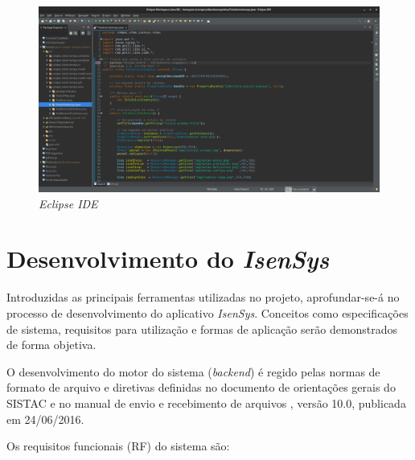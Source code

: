 \documentclass[
	12pt,			%
	openright,		%
	oneside,	
	a4paper,		%
	english,		%
	brazil			%
]{abntex2/abntex2}  %
\begin{document}
			\begin{figure}[H]
				\begin{center}
				
					\caption{\textit{Eclipse IDE}}
					\label{eclipse-img}
				
					\includegraphics[scale=0.25]{img/eclipse-ide}
					
				\end{center}
			\end{figure}

	\chapter{Desenvolvimento do \textit{IsenSys}} \label{cap3-desenvolvimento}

		Introduzidas as principais ferramentas utilizadas no projeto, aprofundar-se-á no processo de desenvolvimento do aplicativo \textit{IsenSys}. Conceitos como especificações de sistema, requisitos para utilização e formas de aplicação serão demonstrados de forma objetiva.
		
		O desenvolvimento do motor do sistema (\textit{backend}) é regido pelas normas de formato de arquivo e diretivas definidas no documento de orientações gerais do SISTAC \cite{sistac-gerais} e no manual de envio e recebimento de arquivos \cite{sistac-formatos}, versão 10.0, publicada em 24/06/2016.
		
		Os requisitos funcionais (RF) do sistema são:
	
\end{document}
